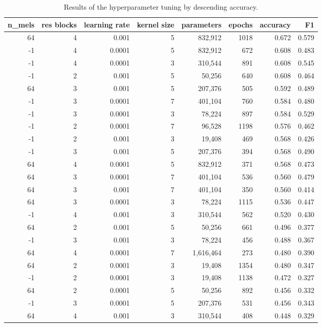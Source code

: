 \begin{table}[h]
\centering
\captionsetup{width=0.9\linewidth}
\caption{Results of the hyperparameter tuning by descending accuracy.}
\label{fig:hyperparameters_results}
\scriptsize
\begin{tabular}{rrrrrrrr}
\toprule
\textbf{n\_mels} & \textbf{res blocks} & \textbf{learning rate} & \textbf{kernel size}& \textbf{parameters} & \textbf{epochs} & \textbf{accuracy} & \textbf{F1} \\
\midrule
64 & 4 & 0.001 & 5 & 832,912 & 1018 & 0.672 & 0.579 \\
-1 & 4 & 0.0001 & 5 & 832,912 & 672 & 0.608 & 0.483 \\
-1 & 4 & 0.0001 & 3 & 310,544 & 891 & 0.608 & 0.545 \\
-1 & 2 & 0.001 & 5 & 50,256 & 640 & 0.608 & 0.464 \\
64 & 3 & 0.001 & 5 & 207,376 & 505 & 0.592 & 0.489 \\
-1 & 3 & 0.0001 & 7 & 401,104 & 760 & 0.584 & 0.480 \\
-1 & 3 & 0.0001 & 3 & 78,224 & 897 & 0.584 & 0.529 \\
-1 & 2 & 0.0001 & 7 & 96,528 & 1198 & 0.576 & 0.462 \\
-1 & 2 & 0.001 & 3 & 19,408 & 469 & 0.568 & 0.426 \\
-1 & 3 & 0.001 & 5 & 207,376 & 394 & 0.568 & 0.490 \\
64 & 4 & 0.0001 & 5 & 832,912 & 371 & 0.568 & 0.473 \\
64 & 3 & 0.0001 & 7 & 401,104 & 536 & 0.560 & 0.479 \\
64 & 3 & 0.001 & 7 & 401,104 & 350 & 0.560 & 0.414 \\
64 & 3 & 0.0001 & 3 & 78,224 & 1115 & 0.536 & 0.447 \\
-1 & 4 & 0.001 & 3 & 310,544 & 562 & 0.520 & 0.430 \\
64 & 2 & 0.001 & 5 & 50,256 & 661 & 0.496 & 0.377 \\
-1 & 3 & 0.001 & 3 & 78,224 & 456 & 0.488 & 0.367 \\
64 & 4 & 0.0001 & 7 & 1,616,464 & 273 & 0.480 & 0.390 \\
64 & 2 & 0.0001 & 3 & 19,408 & 1354 & 0.480 & 0.347 \\
-1 & 2 & 0.0001 & 3 & 19,408 & 1138 & 0.472 & 0.327 \\
64 & 2 & 0.0001 & 5 & 50,256 & 892 & 0.456 & 0.332 \\
-1 & 3 & 0.0001 & 5 & 207,376 & 531 & 0.456 & 0.343 \\
64 & 4 & 0.001 & 3 & 310,544 & 408 & 0.448 & 0.329 \\

\end{tabular}
\end{table}
